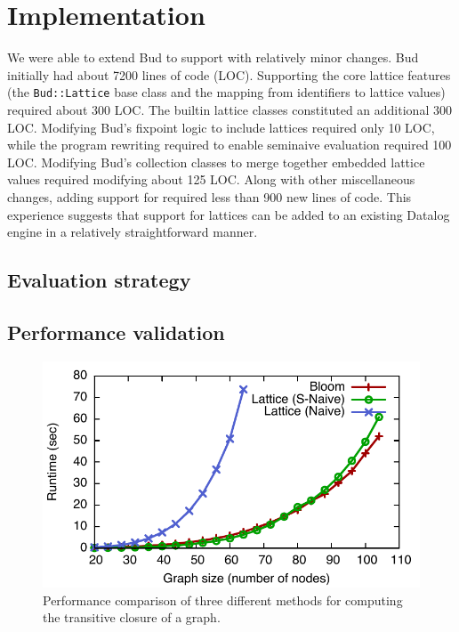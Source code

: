 \section{Implementation}
\label{sec:impl}

We were able to extend Bud to support \lang with relatively minor changes. Bud
initially had about 7200 lines of code (LOC). Supporting the core lattice
features (the \texttt{Bud::Lattice} base class and the mapping from identifiers
to lattice values) required about 300 LOC. The builtin lattice classes
constituted an additional 300 LOC. Modifying Bud's fixpoint logic to include
lattices required only 10 LOC, while the program rewriting required to enable
seminaive evaluation required 100 LOC. Modifying Bud's collection classes to
merge together embedded lattice values required modifying about 125 LOC. Along
with other miscellaneous changes, adding support for \lang required less than
900 new lines of code. This experience suggests that support for lattices can be
added to an existing Datalog engine in a relatively straightforward manner.

\subsection{Evaluation strategy}

\subsection{Performance validation}
\label{sec:lattice-perf}

\begin{figure}[t]
\includegraphics[width=\linewidth]{fig/sn_perf}
\caption{Performance comparison of three different methods for computing the
  transitive closure of a graph.}
\label{fig:tc-perf-graph}
\end{figure}

